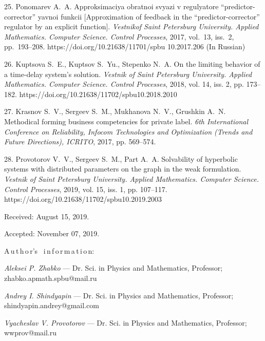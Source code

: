{25. Ponomarev A.~A. Approksimaciya obratnoi svyazi v regulyatore
``predictor-corrector'' yavnoi funkcii [Approximation of feedback
in the ``predictor-corrector'' regulator by an explicit function].
\textit{Vestnik\linebreak\newpage\noindent of Saint Petersburg
University. Applied Mathematics. Computer Science. Control
Processes}, 2017, vol.~13, iss.~2, pp.~193--208.
https://doi.org/10.21638/11701/spbu 10.2017.206  (In Russian)

26. Kuptsova S.~E., Kuptsov S.~Yu., Stepenko N.~A. On the limiting
behavior of a time-delay system's solution. \textit{Vestnik of
Saint Petersburg University. Applied Mathematics. Computer
Science. Control Processes}, 2018, vol. 14, iss. 2, pp. 173--182.
https://doi.org/10.21638/11702/spbu10.2018.2010

27. Krasnov S.~V., Sergeev S.~M., Mukhanova N.~V., Grushkin A.~N.
Methodical forming business competencies for private label.
\emph{6th International Conference on Reliability, Infocom
Technologies and Optimization (Trends and Future Directions),
ICRITO}, 2017, pp. 569--574.

28. Provotorov V.~V., Sergeev S.~M., Part A.~A. Solvability of
hyperbolic systems with distributed parameters on the graph in the
weak formulation. \textit{Vestnik of Saint Petersburg University.
Applied Mathematics. Computer Science. Control Processes}, 2019,
vol. 15, iss. 1, pp. 107--117.
https://doi.org/10.21638/11702/spbu10.2019.2003



\vskip 1.5mm

%


Received:  August 15, 2019.

Accepted: November 07, 2019.

\vskip 6mm A\,u\,t\,h\,o\,r's \ i\,n\,f\,o\,r\,m\,a\,t\,i\,o\,n:

\vskip 2mm \textit{Aleksei P. Zhabko} --- Dr. Sci. in  Physics and
Mathematics, Professor; zhabko.apmath.spbu@mail.ru

\vskip 2mm \textit{Andrey I. Shindyapin} --- Dr. Sci.  in  Physics
and Mathematics, Professor; shindyapin.andrey@gmail.com

\vskip 2mm \textit{Vyacheslav V. Provotorov} --- Dr. Sci. in
Physics and Mathematics, Professor; wwprov@mail.ru

}
